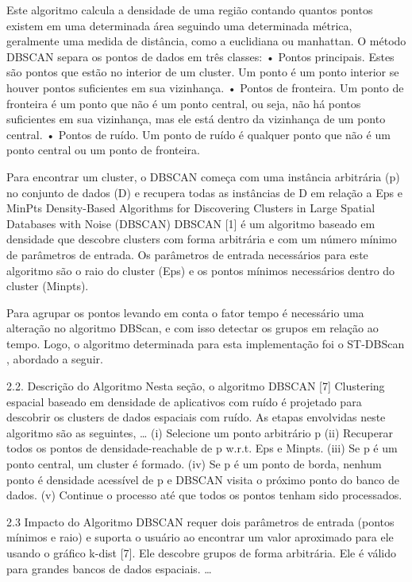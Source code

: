 Este algoritmo calcula a densidade de uma região contando quantos pontos existem em uma determinada área seguindo uma determinada métrica, geralmente uma medida de distância, como a euclidiana ou manhattan. O método DBSCAN separa os pontos de dados em três classes:
• Pontos principais. Estes são pontos que estão no interior de um cluster. Um ponto é um ponto interior se houver pontos suficientes em sua vizinhança.
• Pontos de fronteira. Um ponto de fronteira é um ponto que não é um ponto central, ou seja, não há pontos suficientes em sua vizinhança, mas ele está dentro da vizinhança de um ponto central.
• Pontos de ruído. Um ponto de ruído é qualquer ponto que não é um ponto central ou um ponto de fronteira.

Para encontrar um cluster, o DBSCAN começa com uma instância arbitrária (p) no conjunto de dados (D) e recupera todas as instâncias de D em relação a Eps e MinPts
Density-Based Algorithms for Discovering Clusters in Large Spatial Databases with Noise (DBSCAN)
DBSCAN [1] é um algoritmo baseado em densidade que descobre clusters com forma arbitrária e com um número mínimo de parâmetros de entrada. Os parâmetros de entrada necessários para este algoritmo são o raio do cluster (Eps) e os pontos mínimos necessários dentro do cluster (Minpts).

Para agrupar os pontos levando em conta o fator tempo é necessário uma alteração no algoritmo DBScan, e com isso detectar os grupos em relação ao tempo. Logo, o algoritmo determinada para esta implementação foi o ST-DBScan \cite{Birant2007STDBSCANAA}, abordado a seguir.

2.2. Descrição do Algoritmo
Nesta seção, o algoritmo DBSCAN [7] Clustering espacial baseado em densidade de aplicativos com ruído é projetado para descobrir os clusters de dados espaciais com ruído. As etapas envolvidas neste algoritmo são as seguintes,
…
(i) Selecione um ponto arbitrário p
(ii) Recuperar todos os pontos de densidade-reachable de p w.r.t. Eps e Minpts.
(iii) Se p é um ponto central, um cluster é formado.
(iv) Se p é um ponto de borda, nenhum ponto é densidade acessível de p e DBSCAN visita o próximo ponto do banco de dados.
(v) Continue o processo até que todos os pontos tenham sido processados.

2.3 Impacto do Algoritmo
DBSCAN requer dois parâmetros de entrada (pontos mínimos e raio) e suporta o usuário ao encontrar um valor aproximado para ele usando o gráfico k-dist [7]. Ele descobre grupos de forma arbitrária. Ele é válido para grandes bancos de dados espaciais.
…

